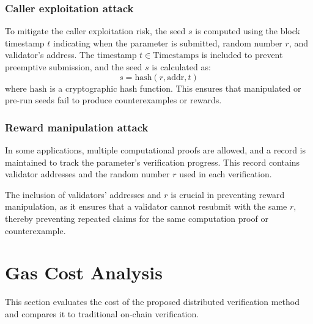\documentclass[runningheads]{llncs}
\begin{document}
\subsubsection{Caller exploitation attack}
To mitigate the caller exploitation risk, the seed \( s \) is computed using the block timestamp \( t \) indicating when the parameter is submitted, random number \( r \), and validator's address. The timestamp \( t \in \text{Timestamps} \) is included to prevent preemptive submission, and the seed \( s \) is calculated as:
\begin{equation}
s = \text{hash}(r, \text{addr}, t)
\end{equation}
where \(\text{hash}\) is a cryptographic hash function. This ensures that manipulated or pre-run seeds fail to produce counterexamples or rewards.
\subsubsection{Reward manipulation attack}
In some applications, multiple computational proofs are allowed, and a record is maintained to track the parameter's verification progress. This record contains validator addresses and the random number \( r \) used in each verification. 

The inclusion of validators' addresses and \( r \) is crucial in preventing reward manipulation, as it ensures that a validator cannot resubmit with the same \( r \), thereby preventing repeated claims for the same computation proof or counterexample.
\section{Gas Cost Analysis}
\label{sec:gas-cost-analysis}
This section evaluates the cost of the proposed distributed verification method and compares it to traditional on-chain verification.
\end{document}
